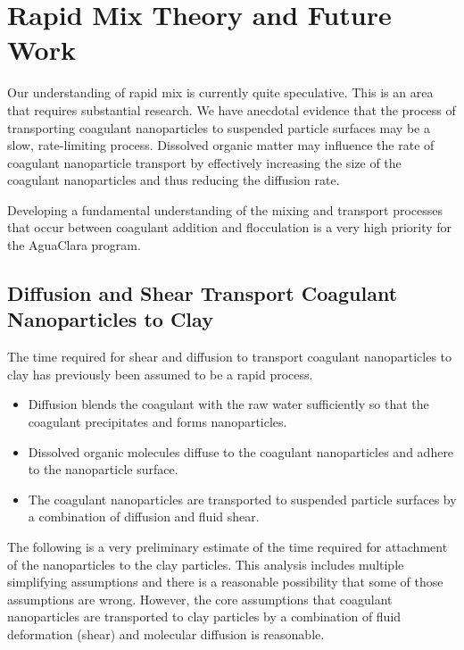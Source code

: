 \documentclass[letterpaper,10pt,english]{sphinxmanual}
\begin{document}
\chapter{Rapid Mix Theory and Future Work}
\label{\detokenize{Rapid_Mix/RM_Theory_and_Future_Work:rapid-mix-theory-and-future-work}}\label{\detokenize{Rapid_Mix/RM_Theory_and_Future_Work:title-rapid-mix-theory-and-future-work}}\label{\detokenize{Rapid_Mix/RM_Theory_and_Future_Work::doc}}
Our understanding of rapid mix is currently quite speculative. This is an area that requires substantial research. We have anecdotal evidence that the process of transporting coagulant nanoparticles to suspended particle surfaces may be a slow, rate-limiting process. Dissolved organic matter may influence the rate of coagulant nanoparticle transport by effectively increasing the size of the coagulant nanoparticles and thus reducing the diffusion rate.

Developing a fundamental understanding of the mixing and transport processes that occur between coagulant addition and flocculation is a very high priority for the AguaClara program.


\section{Diffusion and Shear Transport Coagulant Nanoparticles to Clay}
\label{\detokenize{Rapid_Mix/RM_Theory_and_Future_Work:diffusion-and-shear-transport-coagulant-nanoparticles-to-clay}}\label{\detokenize{Rapid_Mix/RM_Theory_and_Future_Work:heading-diffusion-and-shear-transport-coagulant-nanoparticles-to-clay}}
The time required for shear and diffusion to transport coagulant nanoparticles to clay has previously been assumed to be a rapid process.
\begin{itemize}
\item {} 
Diffusion blends the coagulant with the raw water sufficiently so that the coagulant precipitates and forms nanoparticles.

\item {} 
Dissolved organic molecules diffuse to the coagulant nanoparticles and adhere to the nanoparticle surface.

\item {} 
The coagulant nanoparticles are transported to suspended particle surfaces by a combination of diffusion and fluid shear.

\end{itemize}

The following is a very preliminary estimate of the time required for attachment of the nanoparticles to the clay particles. This analysis includes multiple simplifying assumptions and there is a reasonable possibility that some of those assumptions are wrong. However, the core assumptions that coagulant nanoparticles are transported to clay particles by a combination of fluid deformation (shear) and molecular diffusion is reasonable.
\end{document}
